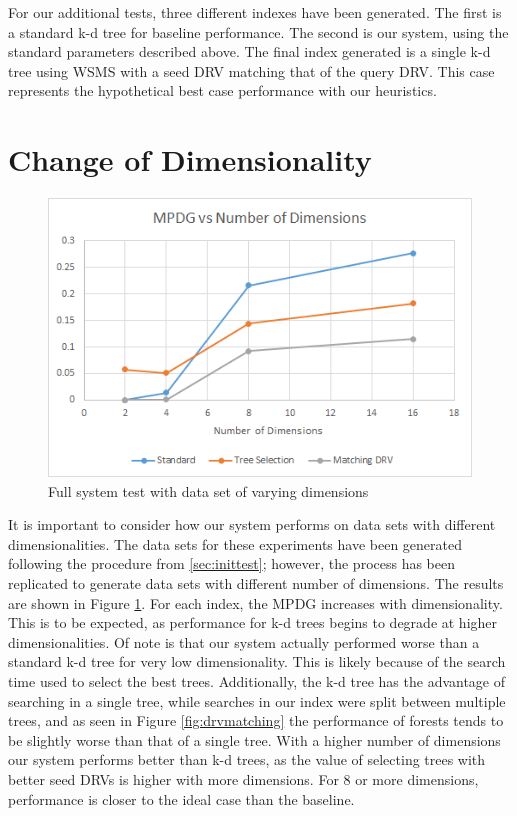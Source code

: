 For our additional tests, three different indexes have been generated.  The first is a standard k-d tree for baseline performance.  The second is our system, using the standard parameters described above.  The final index generated is a single k-d tree using WSMS with a seed DRV matching that of the query DRV.  This case represents the hypothetical best case performance with our heuristics.

\section{Change of Dimensionality}

\begin{figure}[h]
\begin{center}
\includegraphics[width=.85\textwidth]{Figures/dims}
\end{center}
\caption{Full system test with data set of varying dimensions}
\label{fig:dim}
\end{figure}

It is important to consider how our system performs on data sets with different dimensionalities.  The data sets for these experiments have been generated following the procedure from \ref{sec:inittest}; however, the process has been replicated to generate data sets with different number of dimensions.  The results are shown in Figure \ref{fig:dim}.  For each index, the MPDG increases with dimensionality.  This is to be expected, as performance for k-d trees begins to degrade at higher dimensionalities.  Of note is that our system actually performed worse than a standard k-d tree for very low dimensionality.  This is likely because of the search time used to select the best trees.  Additionally, the k-d tree has the advantage of searching in a single tree, while searches in our index were split between multiple trees, and as seen in Figure \ref{fig:drvmatching} the performance of forests tends to be slightly worse than that of a single tree.  With a higher number of dimensions our system performs better than k-d trees, as the value of selecting trees with better seed DRVs is higher with more dimensions.  For 8 or more dimensions, performance is closer to the ideal case than the baseline.

